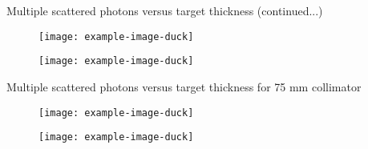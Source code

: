 \documentclass{beamer}
\begin{document}
\begin{frame}
\begin{block}{\large Multiple scattered photons versus target thickness (continued...)}
\begin{figure}
    \begin{minipage}{150pt}
    \begin{center}
    \texttt{[image: example-image-duck]}
    \end{center}    
    \end{minipage}
\hfill
    \begin{minipage}{150pt}
    \begin{center}
    \texttt{[image: example-image-duck]}
    \end{center}    
    \end{minipage}
\hfill
\end{figure}
\end{block}
\end{frame}


\begin{frame}
\begin{block}{\large Multiple scattered photons versus target thickness for 75 mm collimator}
    \setcounter{subfigure}{0}
\begin{figure}
    \begin{minipage}{150pt}
    \begin{center}
    \texttt{[image: example-image-duck]}
    \end{center}    
    \end{minipage}
\hfill
    \begin{minipage}{150pt}
    \begin{center}
    \texttt{[image: example-image-duck]}
    \end{center}    
    \end{minipage}
\hfill
\end{figure}
\end{block}
\end{frame}
\end{document}
